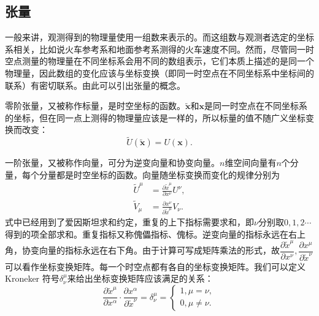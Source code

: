 \documentclass[11pt, a4paper, oneside, onecolumn]{ctexart}
\numberwithin{equation}{subsection}
\begin{document}
\subsection{张量}
一般来讲，观测得到的物理量使用一组数来表示的。而这组数与观测者选定的坐标系相关，比如说火车参考系和地面参考系测得的火车速度不同。然而，尽管同一时空点测量的物理量在不同坐标系会用不同的数组表示，它们本质上描述的是同一个物理量，因此数组的变化应该与坐标变换（即同一时空点在不同坐标系中坐标间的联系）有密切联系。由此可以引出张量的概念。

零阶张量，又被称作标量，是时空坐标的函数。$\widetilde{\boldsymbol{x}}$和$\boldsymbol{x}$是同一时空点在不同坐标系的坐标，但在同一点上测得的物理量应该是一样的，所以标量的值不随广义坐标变换而改变：
\begin{equation}
\widetilde{U}\left(\widetilde{\boldsymbol{x}}\right)=U\left(\boldsymbol{x}\right).
\end{equation}

一阶张量，又被称作向量，可分为逆变向量和协变向量。$n$维空间向量有$n$个分量，每个分量都是时空坐标的函数。向量随坐标变换而变化的规律分别为
\begin{align}
\widetilde{U}^{\mu}&=\frac{\partial{}\widetilde{x}^{\mu}}{\partial{}x^{\nu}}U^{\nu},\\
\widetilde{V}_{\mu}&=\frac{\partial{}{x}^{\nu}}{\partial{}\widetilde{x}^{\mu}}V_{\nu}.
\end{align}
式中已经用到了爱因斯坦求和约定，重复的上下指标需要求和，即$\nu$分别取$0,1,2\cdots$得到的项全部求和。重复指标又称傀儡指标、傀标。逆变向量的指标永远在右上角，协变向量的指标永远在右下角。由于计算可写成矩阵乘法的形式，故$\dfrac{\partial{}\widetilde{x}^{\mu}}{\partial{}x^{\nu}},\dfrac{\partial{}x^{\mu}}{\partial{}\widetilde{x}^{\nu}}$可以看作坐标变换矩阵。每一个时空点都有各自的坐标变换矩阵。我们可以定义 Kroneker 符号$\delta{}^{\mu}_{\nu}$来给出坐标变换矩阵应该满足的关系：
\begin{equation}
\frac{\partial{}\widetilde{x}^{\mu}}{\partial{}x^{\alpha}}\cdot\frac{\partial{}x^{\alpha}}{\partial{}\widetilde{x}^{\nu}}=\delta{}_{\nu}^{\mu}=
\begin{cases}
1,\mu=\nu,\\
0,\mu\ne\nu.
\end{cases}\label{1.1.4}
\end{equation}
\end{document}
